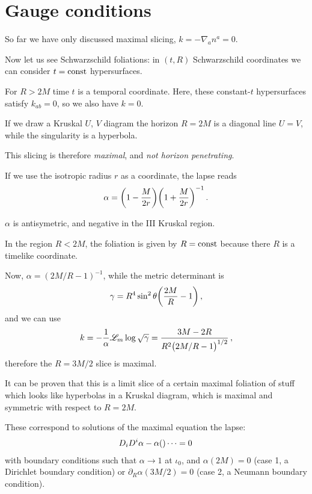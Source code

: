 \documentclass[main.tex]{subfiles}
\begin{document}
\section{Gauge conditions}


So far we have only discussed maximal slicing, \(k = - \nabla_a n^a = 0\). 

Now let us see Schwarzschild foliations: in \((t, R)\) Schwarzschild coordinates we can consider \(t= \text{const}\) hypersurfaces. 

For \(R > 2M\) time \(t\) is a temporal coordinate. Here, these constant-\(t\) hypersurfaces satisfy \(k_{ab} = 0\), so we also have \(k=0\). 

If we draw a Kruskal \(U\), \(V\) diagram the horizon \(R = 2M\) is a diagonal line \(U=V\), while the singularity is a hyperbola. 

This slicing is therefore \emph{maximal}, and \emph{not horizon penetrating}. 

If we use the isotropic radius \(r\) as a coordinate, the lapse reads 
%
\begin{align}
\alpha = \qty(1 - \frac{M}{2r}) \qty(1 + \frac{M}{2r})^{-1}
\,.
\end{align}

\(\alpha \) is antisymetric, and negative in the III Kruskal region. 

In the region \(R < 2M\), the foliation is given by \(R = \text{const}\) because there \(R\) is a timelike coordinate. 

Now, \(\alpha = (2M / R - 1)^{-1}\), while the metric determinant  is 
%
\begin{align}
\gamma = R^{4} \sin^2 \theta \qty( \frac{2M}{R } - 1)
\,,
\end{align}
%
and we can use 
%
\begin{align}
k = - \frac{1}{\alpha } \mathscr{L}_m \log \sqrt{ \gamma } 
= \frac{3M - 2R}{R^2 \qty( 2M / R - 1)^{1/2}}
\,,
\end{align}
%
therefore the \(R = 3M/2\) slice is maximal. 

It can be proven that this is a limit slice of a certain maximal foliation of stuff which looks like hyperbolas in a Kruskal diagram, which is maximal and symmetric with respect to \(R = 2M\). 

These correspond to solutions of the maximal equation the lapse: 
%
\begin{align}
D_i D^{i}  \alpha - \alpha \qty()\dots = 0
\,
\end{align}
%
with boundary conditions such that \(\alpha \to 1\) at \(\iota_0 \), and \(\alpha (2M) = 0\) (case 1, a Dirichlet boundary condition) or \(\partial_{R} \alpha (3M/2) = 0\) (case 2, a Neumann boundary condition). 
\end{document}

